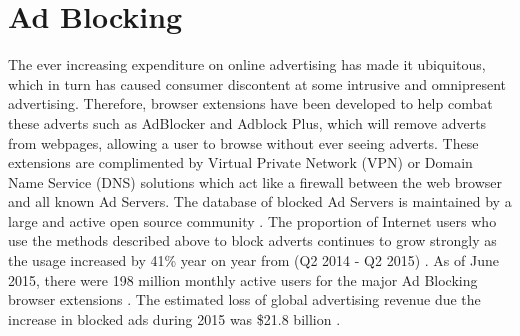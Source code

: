 \documentclass[12pt]{article}
\begin{document}
\pagebreak

\section{Ad Blocking}
The ever increasing expenditure on online advertising has made it ubiquitous, which in turn has caused consumer discontent at some intrusive and omnipresent advertising. Therefore, browser extensions have been developed to help combat these adverts such as AdBlocker and Adblock Plus, which will remove adverts from webpages, allowing a user to browse without ever seeing adverts. These extensions are complimented by Virtual Private Network (VPN) or Domain Name Service (DNS) solutions which act like a firewall between the web browser and all known Ad Servers. The database of blocked Ad Servers is maintained by a large and active open source community \parencite{adobeAdBlock}. The proportion of Internet users who use the methods described above to block adverts continues to grow strongly as the usage increased by 41\% year on year from (Q2 2014 - Q2 2015) \parencite{adobeAdBlock}. As of June 2015, there were 198 million monthly active users for the major Ad Blocking browser extensions \parencite{adobeAdBlock}. The estimated loss of global advertising revenue due the increase in blocked ads during 2015 was \$21.8 billion \parencite{adobeAdBlock}. \\
\end{document}
